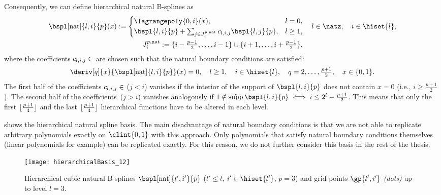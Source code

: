 Consequently, we can define hierarchical natural B-splines as
\begin{subequations}
  \begin{gather}
    \bspl[\ntrl]{l,i}{p}(x)
    :=
    \begin{cases}
      \lagrangepoly{0,i}(x),&
      l = 0,\\
      \bspl{l,i}{p} +
      \sum_{j \in J_i^{p,\ntrl}} c_{l,i,j} \bspl{l,j}{p},&
      l \ge 1,
    \end{cases}\quad
    l \in \natz,\quad
    i \in \hiset{l},\\
    J_i^{p,\ntrl}
    := \{i-\tfrac{p-1}{2}, \dotsc, i-1\} \cup
    \{i+1, \dotsc, i+\tfrac{p-1}{2}\},
  \end{gather}
\end{subequations}
where the coefficients $c_{l,i,j} \in \real$ are chosen such that
the natural boundary conditions are satisfied:
\begin{equation}
  \deriv[q]{x}{\bspl[\ntrl]{l,i}{p}}(x)
  = 0,\quad
  l \ge 1,\quad
  i \in \hiset{l},\quad
  q = 2, \dotsc, \tfrac{p+1}{2},\quad
  x \in \{0, 1\}.
\end{equation}
The first half of the coefficients $c_{l,i,j} \in \real$
($j < i$) vanishes if the interior of the support of $\bspl{l,i}{p}$
does not contain $x = 0$
(i.e., $i \ge \tfrac{p+1}{2}$).
The second half of the coefficients~($j > i$) vanishes analogously
if $1 \notin \interiorsupp \bspl{l,i}{p} \iff i \le 2^l - \tfrac{p+1}{2}$.
This means that
only the first $\lfloor\tfrac{p+1}{4}\rfloor$ and the last $\lfloor\tfrac{p+1}{4}\rfloor$
hierarchical functions have to be altered in each level.

 shows the hierarchical natural spline basis.
The main disadvantage of natural boundary conditions is that
we are not able to replicate arbitrary polynomials exactly on $\clint{0, 1}$
with this approach.
Only polynomials that satisfy natural boundary conditions themselves
(linear polynomials for example)
can be replicated exactly.
For this reason, we do not further consider this basis in the
rest of the thesis.

\begin{SCfigure}
  \texttt{[image: hierarchicalBasis\_12]}%
  \caption[%
    Hierarchical natural B-splines%
  ]{%
    Hierarchical cubic natural B-splines
    \vspace{-0.1em}%
    $\bspl[\ntrl]{l',i'}{p}$
    ($l' \le l$, $i' \in \hiset{l'}$, $p = 3$) and
    \vspace{0.05em}%
    grid points $\gp{l',i'}$ \emph{(dots)} up to level $l = 3$.%
  }%
  \label{fig:naturalBSpline}%
\end{SCfigure}
